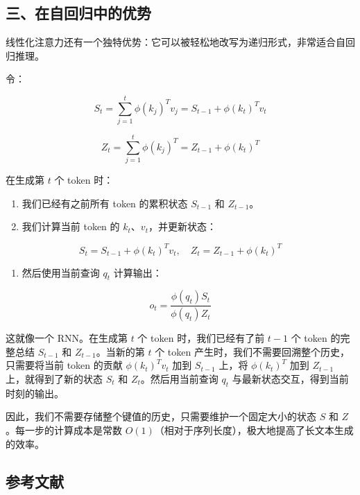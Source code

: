 \hypertarget{ux4e09ux5728ux81eaux56deux5f52ux4e2dux7684ux4f18ux52bf}{%
\subsection{三、在自回归中的优势}\label{ux4e09ux5728ux81eaux56deux5f52ux4e2dux7684ux4f18ux52bf}}

线性化注意力还有一个独特优势：它可以被轻松地改写为递归形式，非常适合自回归推理。

令：

\[
S_t = \sum_{j=1}^{t}\phi(k_j)^T v_j
= S_{t-1}+\phi(k_t)^T v_t
\]

\[
Z_t = \sum_{j=1}^{t}\phi(k_j)^T
= Z_{t-1}+\phi(k_t)^T
\]

在生成第 \(t\) 个 token 时：

\begin{enumerate}
\def\labelenumi{\arabic{enumi}.}
\tightlist
\item
  我们已经有之前所有 token 的累积状态 \(S_{t-1}\) 和 \(Z_{t-1}\)。
\item
  我们计算当前 token 的 \(k_t\)、\(v_t\)，并更新状态：
\end{enumerate}

\[
S_t = S_{t-1}+\phi(k_t)^T v_t,\quad
Z_t = Z_{t-1}+\phi(k_t)^T
\]

\begin{enumerate}
\def\labelenumi{\arabic{enumi}.}
\setcounter{enumi}{2}
\tightlist
\item
  然后使用当前查询 \(q_t\) 计算输出：
\end{enumerate}

\[
o_t = \frac{\phi(q_t)S_t}{\phi(q_t)Z_t}
\]

这就像一个 RNN。在生成第 \(t\) 个 token 时，我们已经有了前 \(t-1\) 个 token 的完整总结 \(S_{t-1}\) 和 \(Z_{t-1}\)。当新的第 \(t\) 个 token 产生时，我们不需要回溯整个历史，只需要将当前 token 的贡献 \(\phi(k_t)^T v_t\) 加到 \(S_{t-1}\) 上，将 \(\phi(k_t)^T\) 加到 \(Z_{t-1}\) 上，就得到了新的状态 \(S_t\) 和 \(Z_t\)。然后用当前查询 \(q_t\) 与最新状态交互，得到当前时刻的输出。

因此，我们不需要存储整个键值的历史，只需要维护一个固定大小的状态 \(S\) 和 \(Z\)。每一步的计算成本是常数 \(O(1)\)（相对于序列长度），极大地提高了长文本生成的效率。

\hypertarget{ux53c2ux8003ux6587ux732e-98}{%
\subsection{参考文献}\label{ux53c2ux8003ux6587ux732e-98}}


